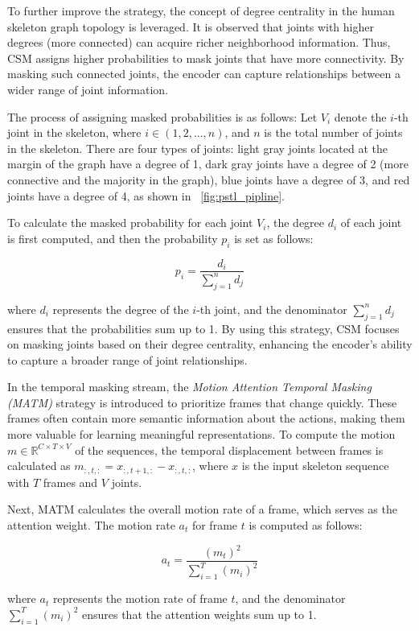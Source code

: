 To further improve the strategy, the concept of degree centrality in the human skeleton graph topology is leveraged. It is observed that joints with higher degrees (more connected) can acquire richer neighborhood information. Thus, CSM assigns higher probabilities to mask joints that have more connectivity. By masking such connected joints, the encoder can capture relationships between a wider range of joint information.

The process of assigning masked probabilities is as follows: Let \(V_i\) denote the \(i\)-th joint in the skeleton, where \(i \in (1, 2, ..., n)\), and \(n\) is the total number of joints in the skeleton. There are four types of joints: light gray joints located at the margin of the graph have a degree of 1, dark gray joints have a degree of 2 (more connective and the majority in the graph), blue joints have a degree of 3, and red joints have a degree of 4, as shown in ~\ref{fig:pstl_pipline}.

To calculate the masked probability for each joint \(V_i\), the degree \(d_i\) of each joint is first computed, and then the probability \(p_i\) is set as follows:

\[ p_i = \frac{d_i}{\sum_{j=1}^n d_j} \]

where \(d_i\) represents the degree of the \(i\)-th joint, and the denominator \(\sum_{j=1}^n d_j\) ensures that the probabilities sum up to 1. By using this strategy, CSM focuses on masking joints based on their degree centrality, enhancing the encoder's ability to capture a broader range of joint relationships.

In the temporal masking stream, the \textit{Motion Attention Temporal Masking (MATM)} strategy is introduced to prioritize frames that change quickly. These frames often contain more semantic information about the actions, making them more valuable for learning meaningful representations. To compute the motion \(m \in \mathbb{R}^{C \times T \times V}\) of the sequences, the temporal displacement between frames is calculated as \(m_{:,t,:} = x_{:,t+1,:} - x_{:,t,:}\), where \(x\) is the input skeleton sequence with \(T\) frames and \(V\) joints.

Next, MATM calculates the overall motion rate of a frame, which serves as the attention weight. The motion rate \(a_t\) for frame \(t\) is computed as follows:

\[ a_t = \frac{(m_t)^2}{\sum_{i=1}^T (m_i)^2} \]

where \(a_t\) represents the motion rate of frame \(t\), and the denominator \(\sum_{i=1}^T (m_i)^2\) ensures that the attention weights sum up to 1.

